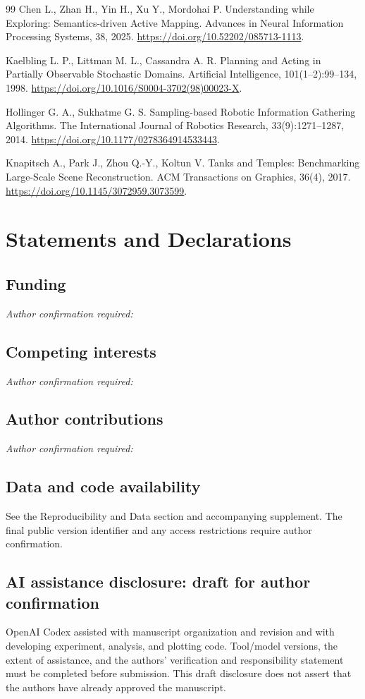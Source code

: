 \documentclass[11pt,a4paper]{article}
\begin{document}
\begin{thebibliography}{99}
 Chen L., Zhan H., Yin H., Xu Y., Mordohai P. Understanding while Exploring: Semantics-driven Active Mapping. Advances in Neural Information Processing Systems, 38, 2025. \url{https://doi.org/10.52202/085713-1113}.

 Kaelbling L. P., Littman M. L., Cassandra A. R. Planning and Acting in Partially Observable Stochastic Domains. Artificial Intelligence, 101(1--2):99--134, 1998. \url{https://doi.org/10.1016/S0004-3702(98)00023-X}.

 Hollinger G. A., Sukhatme G. S. Sampling-based Robotic Information Gathering Algorithms. The International Journal of Robotics Research, 33(9):1271--1287, 2014. \url{https://doi.org/10.1177/0278364914533443}.

 Knapitsch A., Park J., Zhou Q.-Y., Koltun V. Tanks and Temples: Benchmarking Large-Scale Scene Reconstruction. ACM Transactions on Graphics, 36(4), 2017. \url{https://doi.org/10.1145/3072959.3073599}.
\end{thebibliography}

\section*{Statements and Declarations}
\subsection*{Funding}
\textit{Author confirmation required:} \underline{\hspace{5cm}}
\subsection*{Competing interests}
\textit{Author confirmation required:} \underline{\hspace{5cm}}
\subsection*{Author contributions}
\textit{Author confirmation required:} \underline{\hspace{5cm}}
\subsection*{Data and code availability}
See the Reproducibility and Data section and accompanying supplement.
The final public version identifier and any access restrictions require author confirmation.
\subsection*{AI assistance disclosure: draft for author confirmation}
OpenAI Codex assisted with manuscript organization and revision and with developing
experiment, analysis, and plotting code. Tool/model versions, the extent of assistance,
and the authors' verification and responsibility statement must be completed before submission.
This draft disclosure does not assert that the authors have already approved the manuscript.
\end{document}
